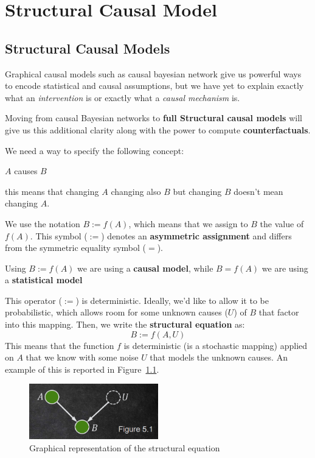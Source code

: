 \chapter{Structural Causal Model}
\section{Structural Causal Models}
Graphical causal models such as causal bayesian network give us powerful ways to
encode statistical and causal assumptions, but we have yet to explain exactly
what an \textit{intervention} is or exactly what a \textit{causal mechanism} is.

Moving from causal Bayesian networks to \textbf{full Structural causal models}
will give us this additional clarity along with the power to compute \textbf{counterfactuals}.

We need a way to specify the following concept:
\begin{center}
    $A$ causes $B$
\end{center}
this means that changing $A$ changing also $B$ but changing $B$ doesn't mean changing $A$.

We use the notation $B := f(A)$, which means that we assign to $B$ the value of
$f(A)$. This symbol ($:=$) denotes an \textbf{asymmetric assignment} and differs
from the symmetric equality symbol ($=$).

\begin{note}
    Using $B := f(A)$ we are using a \textbf{causal model}, while $B = f(A)$ we
    are using a \textbf{statistical model}
\end{note}

This operator ($:=$) is deterministic. Ideally, we'd like to allow it to be
probabilistic, which allows room for some unknown causes ($U$) of $B$ that factor
into this mapping. Then, we write the \textbf{structural equation} as:
\begin{equation*}
    B := f(A, U)
\end{equation*}
This means that the function $f$ is deterministic (is a stochastic mapping)
applied on $A$ that we know with some noise $U$ that models the unknown causes.
An example of this is reported in Figure~\ref{fig:unknown_graphs}.

\begin{figure}[!ht]
    \centering
    \includegraphics[width=0.5\textwidth]{img/structural_causal_model/unknown_graphs.png}
    \caption{Graphical representation of the structural equation}
    \label{fig:unknown_graphs}
\end{figure}

